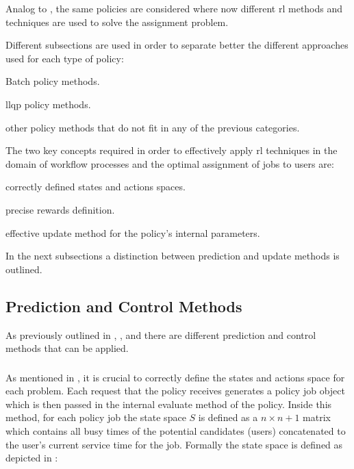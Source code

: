 \documentclass{seal_thesis}
\begin{document}
Analog to , the same policies are considered where now different \gls{rl} methods and techniques are used to solve the assignment problem.

Different subsections are used in order to separate better the different approaches used for each type of policy:
\begin{enumerate*}
	\item Batch policy methods.
	\item \gls{llqp} policy methods.
	\item other policy methods that do not fit in any of the previous categories.
\end{enumerate*}

The two key concepts required in order to effectively apply \gls{rl} techniques in the domain of workflow processes and the optimal assignment of jobs to users are:
\begin{enumerate*}
	\item correctly defined states and actions spaces.
	\item precise rewards definition.
	\item effective update method for the policy's internal parameters. 
\end{enumerate*}

In the next subsections a distinction between prediction and update methods is outlined.

\subsection{Prediction and Control Methods}

As previously outlined in , ,  and  there are different prediction and control methods that can be applied.

\subsubsection{}

As mentioned in , it is crucial to correctly define the states and actions space for each problem. Each request that the policy receives generates a policy job object which is then passed in the internal evaluate method of the policy. Inside this method, for each policy job the state space $S$ is defined as a $n \times n+1$ matrix which contains all busy times of the potential candidates (\ie users) concatenated to the user's current service time for the job. Formally the state space is defined as depicted in :
\end{document}
